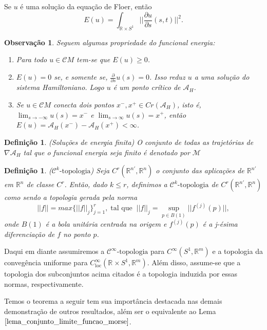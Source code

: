 \documentclass[12pt]{book}
\newtheorem{definicao}[teorema]{Definição}
\newtheorem{observacao}[teorema]{Observação}
\newcommand{\aplicaoessuaves}[2]{C^{\infty}(#1, #2)}
\newcommand{\aplicaoessuavesloc}[2]{C^{\infty}_{\text{loc}}(#1, #2)}
\newcommand{\circulo}{S^{1}}
\newcommand{\cktopologia}[1]{\mathcal{C}^{#1}\text{-topologia}}
\newcommand{\derivadaparcial}[2]{\frac{\partial #1}{\partial #2}}
\newcommand{\energiafinitaM}{\mathcal{M}}
\newcommand{\funcionalH}{\mathcal{A}_{H}}
\newcommand{\gradientefuncional}{\nabla \funcionalH}
\newcommand{\norma}[1]{||#1||}
\newcommand{\normagrande}[1]{\Big|\Big|#1\Big|\Big|}
\newcommand{\pontoscriticos}[1]{\textit{Cr}(#1)}
\newcommand{\retacartesianocirculo}{\real{} \times \circulo}
\newcommand{\real}[1]{\mathbb{R}^{#1}}
\newcommand{\cilindrosLM}{\mathcal{C}M}
\begin{document}
	Se $u$ é uma solução da equação de Floer, então
	$$
	E(u)=\int_{\retacartesianocirculo}\normagrande{\derivadaparcial{u}{s}(s,t)}^{2}.
	$$
	\begin{observacao}
		Seguem algumas propriedade do funcional energia:
		
		\begin{enumerate}
			\item Para todo $u \in \cilindrosLM$ tem-se que $E(u)\geq 0$.
			
			\item $E(u) = 0$ se, e somente se, $\derivadaparcial{}{s}u(s) = 0$. Isso reduz $u$ a uma solução do sistema Hamiltoniano. Logo $u$ é um ponto crítico de $\funcionalH$.
			
			\item Se $u \in \cilindrosLM$ conecta dois pontos $x^{-}, x^{+} \in \pontoscriticos{\funcionalH}$, isto é, $\lim_{s\to -\infty}u(s)=x^{-}$ e $\lim_{s\to \infty}u(s)=x^{+}$, então $E(u)=\funcionalH(x^{-}) - \funcionalH(x^{+})<\infty$.
		\end{enumerate}
		
	\end{observacao}
	
	\begin{definicao}
		(Soluções de energia finita) O conjunto de todas as trajetórias de $\gradientefuncional$ tal que o funcional energia seja finito é denotado por $\energiafinitaM$ 
	\end{definicao}
	
	\begin{definicao}
		($\cktopologia{k}$) Seja $C^{r}(\real{n'}, \real{n})$ o conjunto das aplicações de $\real{n'}$ em $\real{n}$ de classe $C^{r}$. Então, dado $k\leq r$, definimos a $\cktopologia{k}$ de $C^{r}(\real{n'}, \real{n})$ como sendo a topologia gerada pela norma
		$$
		\norma{f} = max \{\norma{f}_{j}\}_{j=1}^{r},\; \text{tal que} \;\; \norma{f}_{j} = \sup_{p \in B(1)}\norma{f^{(j)}(p)},
		$$
		onde $B(1)$ é a bola unitária centrada na origem e $f^{(j)}(p)$ é a j-ésima diferenciação de $f$ no ponto $p$.
	\end{definicao}
	
	Daqui em diante assumiremos a $\cktopologia{\infty}$ para $\aplicaoessuaves{\circulo}{\real{m}}$ e a topologia da convegência uniforme para $\aplicaoessuavesloc{\retacartesianocirculo}{\real{m}}$. Além disso, assume-se que a topologia dos subconjuntos acima citados é a topologia induzida por essas normas, respectivamente.
	
	Temos o teorema a seguir tem sua importância destacada nas demais demonstração de outros resultados, além ser o equivalente ao Lema $\ref{lema_conjunto_limite_funcao_morse}$.
	
\end{document}
